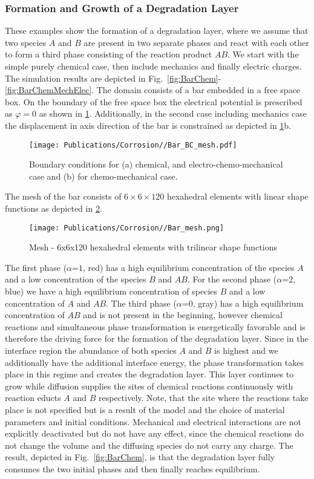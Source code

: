 \subsubsection{Formation and Growth of a Degradation Layer}
These examples show the formation of a degradation layer, where we assume that two species $A$ and $B$ are present in two separate phases and react with each other to form a third phase consisting of the reaction product $AB$. We start with the simple purely chemical case, then include mechanics and finally electric charges. The simulation results are depicted in Fig.~\ref{fig:BarChem}-\ref{fig:BarChemMechElec}. The domain consists of a bar embedded in a free space box. On the boundary of the free space box the electrical potential is prescribed as $\varphi=0$ as shown in \cref{fig:BCs}. Additionally, in the second case including mechanics case the displacement in axis direction of the bar is constrained as depicted in \cref{fig:BCs}b.
\begin{figure}[h!]
  \centering
  \texttt{[image: Publications/Corrosion//Bar\_BC\_mesh.pdf]}
  \caption{Boundary conditions for (a) chemical, and electro-chemo-mechanical case and (b) for chemo-mechanical case.}
  \label{fig:BCs}
\end{figure}
The mesh of the bar consists of $6\times6\times120$ hexahedral elements with linear shape functions as depicted in \cref{fig:Bar_mesh}.
\begin{figure}[h!]
  \centering
  \texttt{[image: Publications/Corrosion//Bar\_mesh.png]}
  \caption{Mesh - 6x6x120 hexahedral elements with trilinear shape functions}
  \label{fig:Bar_mesh}
\end{figure}
The first phase ($\alpha$=$1$, red) has a high equilibrium concentration of the species $A$ and a low concentration of the species $B$ and $AB$. For the second phase ($\alpha$=$2$, blue) we have a high equilibrium concentration of species $B$ and a low concentration of $A$ and $AB$. The third phase ($\alpha$=$0$, gray) has a high equilibrium concentration of $AB$ and is not present in the beginning, however chemical reactions and simultaneous phase transformation is energetically favorable and is therefore the driving force for the formation of the degradation layer. Since in the interface region the abundance of both species $A$ and $B$ is highest and we additionally have the additional interface energy, the phase transformation takes place in this regime and creates the degradation layer. This layer continues to grow while diffusion supplies the sites of chemical reactions continuously with reaction educts $A$ and $B$ respectively. Note, that the site where the reactions take place is not specified but is a result of the model and the choice of material parameters and initial conditions. Mechanical and electrical interactions are not explicitly deactivated but do not have any effect, since the chemical reactions do not change the volume and the diffusing species do not carry any charge. The result, depicted in Fig.~\ref{fig:BarChem}, is that the degradation layer fully consumes the two initial phases and then finally reaches equilibrium.


